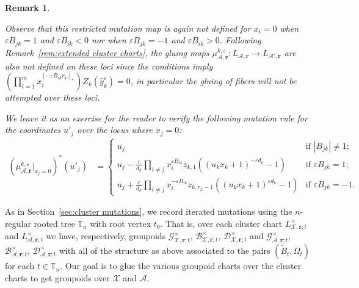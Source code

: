 \documentclass{amsart}
\newtheorem{remark}[theorem]{Remark}
\numberwithin{equation}{section}
\newcommand{\bfr}{{\boldsymbol{r}}}
\newcommand{\cA}{\mathcal{A}}
\newcommand{\cB}{\mathcal{B}}
\newcommand{\cD}{\mathcal{D}}
\newcommand{\cG}{\mathcal{G}}
\newcommand{\cX}{\mathcal{X}}
\newcommand{\TT}{\mathbb{T}}
\begin{document}
\begin{remark}
\begin{enumerate}
      Observe that this restricted mutation map is again not defined for $x_i=0$ when $\varepsilon B_{jk}=1$ and $\varepsilon B_{ik} < 0$ nor when $\varepsilon B_{jk} = -1$ and $\varepsilon B_{ik} > 0$.
      Following Remark~\ref{rem:extended cluster charts}, the gluing maps $\mu_{\cA,\bfr}^{k,\varepsilon}:L_{\cA,\bfr}\to L_{\cA',\bfr}$ are also not defined on these loci since the conditions imply $\left(\prod\limits_{i=1}^m x_i^{[-\varepsilon B_{ik}r_k]_+}\right)Z_k(\hat y_k^\varepsilon)=0$, in particular the gluing of fibers will not be attempted over these loci. 

      We leave it as an exercise for the reader to verify the following mutation rule for the coordinates $u'_j$ over the locus where $x_j=0$:
      \begin{align*}
        (\mu_{\cA,\bfr}^{k,\varepsilon}|_{x_j=0})^*(u'_j)
        &=\begin{cases} 
          u_j & \text{if $|B_{jk}| \ne 1$;}\\ 
          u_j - \frac{\varepsilon}{d_k} \prod_{i\ne j} x_i^{\varepsilon B_{ik}} z_{k,1} ((u_k x_k+1)^{-\varepsilon d_k} - 1) & \text{if $\varepsilon B_{jk} = 1$;}\\ 
          u_j + \frac{\varepsilon}{d_k} \prod_{i\ne j} x_i^{-\varepsilon B_{ik}} z_{k,r_k-1} ( (u_k x_k +1)^{\varepsilon d_k} - 1) & \text{if $\varepsilon B_{jk} = -1$.}
        \end{cases}
      \end{align*}
  \end{enumerate}
\end{remark}

As in Section~\ref{sec:cluster mutations}, we record iterated mutations using the $n$-regular rooted tree $\TT_n$ with root vertex $t_0$.
That is, over each cluster chart $L^\times_{\cX,\bfr;t}$ and $L^\times_{\cA,\bfr;t}$ we have, respectively, groupoids $\cG^\times_{\cX,\bfr;t}$, $\cB^\times_{\cX,\bfr;t}$, $\cD^\times_{\cX,\bfr;t}$ and $\cG^\times_{\cA,\bfr;t}$, $\cB^\times_{\cA,\bfr;t}$, $\cD^\times_{\cA,\bfr;t}$ with all of the structure as above associated to the pairs $(\tilde B_t,\Omega_t)$ for each $t\in\TT_n$.
Our goal is to glue the various groupoid charts over the cluster charts to get groupoids over $\cX$ and $\cA$.
\end{document}
